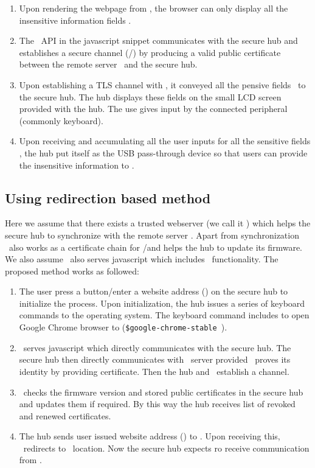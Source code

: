 \begin{enumerate}
  \item Upon rendering the webpage from \server, the browser can only display all the insensitive information fields \insensitive.
  
  \item The \webusb\ API in the javascript snippet communicates with the secure hub and establishes a secure channel (\ssl/\tls) by producing a valid public certificate between the remote server \server\ and the secure hub.
  
  \item Upon establishing a TLS channel with \server, it conveyed all the pensive fields \sensitive\ to the secure hub. The hub displays these fields on the small LCD screen provided with the hub. The use gives input by the connected peripheral (commonly keyboard).
  
  \item Upon receiving and accumulating all the user inputs for all the sensitive fields \sensitive, the hub put itself as the USB pass-through device so that users can provide the insensitive information to \insensitive.
\end{enumerate}

\subsection{Using redirection based method}
  
Here we assume that there exists a trusted webserver (we call it \redir) which helps the secure hub to synchronize with the remote server \server. Apart from synchronization \redir\ also works as a certificate chain for \webusb/\webbt and helps the hub to update its firmware. We also assume \redir\ also serves javascript which includes \webusb\ functionality. The proposed method works as followed:
 

\begin{enumerate}
  \item The user press a button/enter a website address (\server) on the secure hub to initialize the process. Upon initialization, the hub issues a series of keyboard commands to the operating system. The keyboard command includes to open Google Chrome browser to \redir (\texttt{\$google-chrome-stable }\redir).
  
  \item \redir\ serves javascript which directly communicates with the secure hub. The secure hub then directly communicates with \redir\ server provided \redir\ proves its identity by providing certificate. Then the hub and \redir\ establish a \tls channel.
  
  \item \redir\ checks the firmware version and stored public certificates in the secure hub and updates them if required. By this way the hub receives list of revoked and renewed certificates.
  
  \item The hub sends user issued website address (\server) to \redir. Upon receiving this, \redir\ redirects to \server\ location. Now the secure hub expects ro receive communication from \server.
\end{enumerate}

